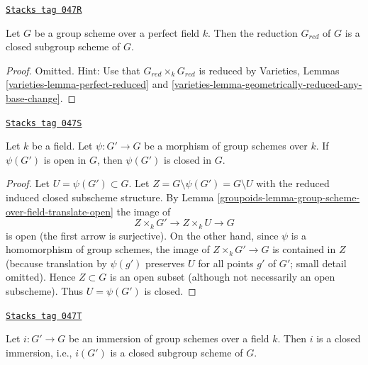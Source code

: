 \begin{lemma}
\label{groupoids-lemma-reduced-subgroup-scheme-perfect}
\href{https://stacks.math.columbia.edu/tag/047R}{\texttt{Stacks tag 047R}}

Let $G$ be a group scheme over a perfect field $k$.
Then the reduction $G_{red}$ of $G$ is a closed subgroup scheme of $G$.
\end{lemma}

\begin{proof}
Omitted. Hint: Use that $G_{red} \times_k G_{red}$ is reduced by
Varieties, Lemmas \ref{varieties-lemma-perfect-reduced} and
\ref{varieties-lemma-geometrically-reduced-any-base-change}.
\end{proof}

\begin{lemma}
\label{groupoids-lemma-open-subgroup-closed-over-field}
\href{https://stacks.math.columbia.edu/tag/047S}{\texttt{Stacks tag 047S}}

Let $k$ be a field. Let $\psi : G' \to G$ be a morphism of group schemes
over $k$. If $\psi(G')$ is open in $G$, then $\psi(G')$ is closed in $G$.
\end{lemma}

\begin{proof}

Let $U = \psi(G') \subset G$. Let $Z = G \setminus \psi(G') = G \setminus U$
with the reduced induced closed subscheme structure. By
Lemma \ref{groupoids-lemma-group-scheme-over-field-translate-open}
the image of
$$
Z \times_k G' \longrightarrow
Z \times_k U \longrightarrow G
$$
is open (the first arrow is surjective). On the other hand, since $\psi$
is a homomorphism of group schemes, the image of $Z \times_k G' \to G$
is contained in $Z$ (because translation by $\psi(g')$ preserves
$U$ for all points $g'$ of $G'$; small detail omitted).
Hence $Z \subset G$ is an open subset (although not
necessarily an open subscheme). Thus $U = \psi(G')$ is closed.
\end{proof}

\begin{lemma}
\label{groupoids-lemma-immersion-group-schemes-closed-over-field}
\href{https://stacks.math.columbia.edu/tag/047T}{\texttt{Stacks tag 047T}}

Let $i : G' \to G$ be an immersion of group schemes over a field $k$.
Then $i$ is a closed immersion, i.e., $i(G')$ is a closed subgroup scheme
of $G$.
\end{lemma}


